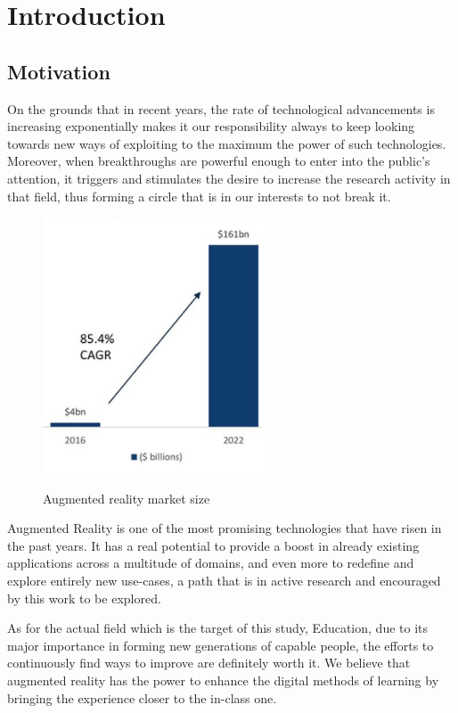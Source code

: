 \documentclass[12 pct]{report}
\begin{document}
\listoffigures

\listoftables

\chapter{Introduction}

\section{Motivation}
On the grounds that in recent years, the rate of technological advancements is increasing exponentially makes it our responsibility always to keep looking towards new ways of exploiting to the maximum the power of such technologies. Moreover, when breakthroughs are powerful enough to enter into the public's attention, it triggers and stimulates the desire to increase the research activity in that field, thus forming a circle that is in our interests to not break it.

\begin{figure}[H]
\includegraphics[width=0.59\textwidth]{ar-chart}
\centering
\label{fig:feature-points}
\caption{Augmented reality market size \cite{consultancy.uk}}
\end{figure}

Augmented Reality is one of the most promising technologies that have risen in the past years. It has a real potential to provide a boost in already existing applications across a multitude of domains, and even more to redefine and explore entirely new use-cases, a path that is in active research and encouraged by this work to be explored.

As for the actual field which is the target of this study, Education, due to its major importance in forming new generations of capable people, the efforts to continuously find ways to improve are definitely worth it. We believe that augmented reality has the power to enhance the digital methods of learning by bringing the experience closer to the in-class one.
\end{document}
